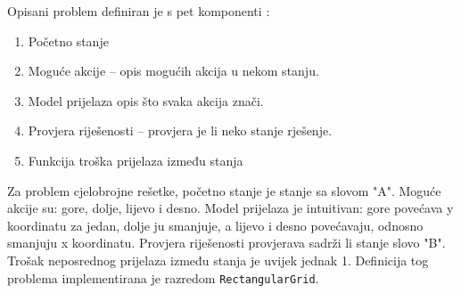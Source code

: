 Opisani problem definiran je s pet komponenti \cite{russelNorvig2003:aima}:

\begin{enumerate}
	\item Početno stanje  
	\item Moguće akcije  -- opis mogućih akcija u nekom stanju.
	\item Model prijelaza  opis što svaka akcija znači. 
	\item Provjera riješenosti  -- provjera je li neko stanje rješenje.
	\item Funkcija troška prijelaza između stanja 
\end{enumerate}

Za problem cjelobrojne rešetke, početno stanje je stanje sa slovom "A".
Moguće akcije su: gore, dolje, lijevo i desno.
Model prijelaza je intuitivan: gore povećava y koordinatu za jedan, dolje ju smanjuje, a lijevo i desno povećavaju, odnosno smanjuju x koordinatu.
Provjera riješenosti provjerava sadrži li stanje slovo "B".
Trošak neposrednog prijelaza između stanja je uvijek jednak 1.
Definicija tog problema implementirana je razredom \texttt{RectangularGrid}.